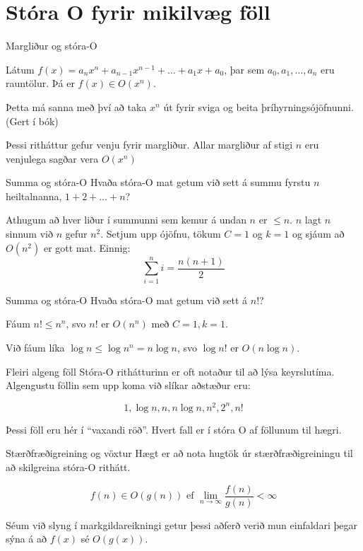 \documentclass[handout]{beamer}
\begin{document}
\section{Stóra O fyrir mikilvæg föll}

\begin{frame}{Margliður og stóra-O}
\begin{tcolorbox}[title=Margliður og stóra O]
Látum $f(x) = a_n x^n + a_{n-1}x^{n-1} + \ldots + a_1x + a_0$, þar sem $a_0, a_1, \ldots, a_n$ eru rauntölur. Þá er $f(x) \in O(x^n)$.
\end{tcolorbox}
Þetta má sanna með því að taka $x^n$ út fyrir sviga og beita þríhyrningsójöfnunni. (Gert í bók)

Þessi ritháttur gefur venju fyrir margliður. Allar margliður af stigi $n$ eru venjulega sagðar vera $O(x^n)$
\end{frame}

\begin{frame}{Summa og stóra-O}
Hvaða stóra-O mat getum við sett á summu fyrstu $n$ heiltalnanna, $1 + 2 + \ldots + n$? \pause

Athugum að hver liður í summunni sem kemur á undan $n$ er $\leq n$. $n$ lagt $n$ sinnum við $n$ gefur $n^2$. Setjum upp ójöfnu, tökum $C = 1$ og $k = 1$ og sjáum að $O(n^2)$ er gott mat.
\pause
Einnig:
\[
 \sum_{i=1}^n i = \frac{n(n+1)}{2}
\]

\end{frame}

\begin{frame}{Summa og stóra-O}
Hvaða stóra-O mat getum við sett á $n!$? \pause

Fáum $n! \leq n^n$, svo $n!$ er $O(n^n)$ með $C=1, k=1$. 

Við fáum líka $\log n \leq \log n^n = n \log n$, svo $\log n!$ er $O(n \log n)$. 
\end{frame}

\begin{frame}{Fleiri algeng föll}
Stóra-O rithátturinn er oft notaður til að lýsa keyrslutíma. Algengustu föllin sem upp koma við slíkar aðstæður eru:

\[
 1, \log n, n, n \log n, n^2 , 2^n , n!
\]

Þessi föll eru hér í ``vaxandi röð''. Hvert fall er í stóra O af föllunum til hægri.
\end{frame}

\begin{frame}{Stærðfræðigreining og vöxtur}
Hægt er að nota hugtök úr stærðfræðigreiningu til að skilgreina stóra-O rithátt.

\[
  f(n) \in O(g(n)) \text{ ef } \lim_{n\to \infty}\frac{f(n)}{g(n)} < \infty
\]

Séum við slyng í markgildareikningi getur þessi aðferð verið mun einfaldari þegar sýna á að $f(x)$ sé $O(g(x))$.
\end{frame}
\end{document}
